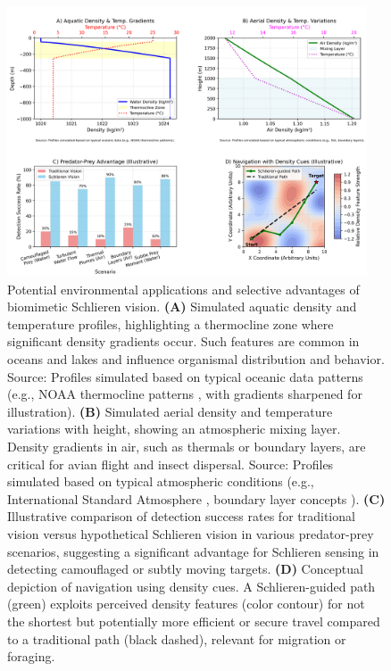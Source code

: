 \documentclass[11pt]{article}
\begin{document}
\begin{figure}[htbp]
    \centering
    \includegraphics[width=0.95\textwidth]{figures/figure4_environmental_applications.png} %
    \caption{Potential environmental applications and selective advantages of biomimetic Schlieren vision.
    \textbf{(A)} Simulated aquatic density and temperature profiles, highlighting a thermocline zone where significant density gradients occur. Such features are common in oceans and lakes and influence organismal distribution and behavior. Source: Profiles simulated based on typical oceanic data patterns (e.g., NOAA thermocline patterns \cite{Talley2011Oceanography}, with gradients sharpened for illustration).
    \textbf{(B)} Simulated aerial density and temperature variations with height, showing an atmospheric mixing layer. Density gradients in air, such as thermals or boundary layers, are critical for avian flight and insect dispersal. Source: Profiles simulated based on typical atmospheric conditions (e.g., International Standard Atmosphere \cite{ISO1975StandardAtmosphere}, boundary layer concepts \cite{Stull1988BoundaryLayer}).
    \textbf{(C)} Illustrative comparison of detection success rates for traditional vision versus hypothetical Schlieren vision in various predator-prey scenarios, suggesting a significant advantage for Schlieren sensing in detecting camouflaged or subtly moving targets.
    \textbf{(D)} Conceptual depiction of navigation using density cues. A Schlieren-guided path (green) exploits perceived density features (color contour) for not the shortest but potentially more efficient or secure travel compared to a traditional path (black dashed), relevant for migration or foraging.}
    \label{fig:environmental_applications}
\end{figure}
\end{document}
